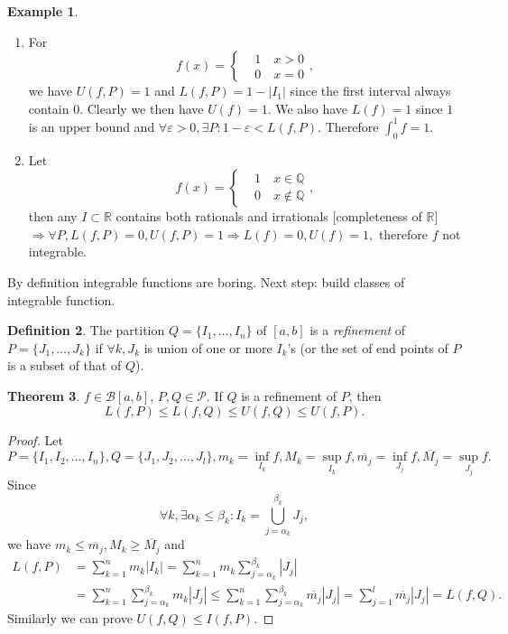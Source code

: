 \documentclass[a4paper]{article}
\theoremstyle{definition}
\newtheorem{defn}{Definition}[subsection]
\newtheorem{thm}[defn]{Theorem}
\newtheorem{example}[defn]{Example}
\begin{document}
\begin{example}
\begin{enumerate}
	\item For
\[
f(x)=\left\{\begin{aligned}
		&1 \quad x>0 \\ &0 \quad x=0
	\end{aligned} \right. ,
\]
 we have $U(f,P)=1$ and $L(f,P)=1-|I_1|$ since the first interval always contain 0. Clearly we then have $U(f)=1$. We also have $L(f)=1$ since $1$ is an upper bound and $\forall \varepsilon >0, \exists P : 1-\varepsilon <L(f,P) .$ Therefore $\int_0^1 f = 1$.
\item Let
\[
f(x)=\left\{\begin{aligned}
	&1 \quad x\in \mathbb Q \\ &0 \quad x\not\in \mathbb Q
\end{aligned} \right. ,
\]
then any $I \subset \mathbb R$ contains both rationals and irrationals [completeness of $\mathbb R$] $\Rightarrow \forall P, L(f,P)=0, U(f,P)=1 \Rightarrow L(f)=0, U(f)=1, $ therefore $f$ not integrable.
\end{enumerate} 
\end{example}

By definition integrable functions are boring. Next step: build classes of integrable function.

\begin{defn}
	The partition $Q=\{I_1,\ldots,I_n\}$ of $[a,b]$ is a \textit{refinement} of $P=\{J_1,\ldots,J_k\}$ if $\forall k, J_k$ is union of one or more $I_k$'s (or the set of end points of $P$ is a subset of that of $Q$).
\end{defn}

\begin{thm}
\label{thm:refineineq}
	$f\in \mathcal B [a,b]$, $P,Q\in \mathcal P$. If $Q$ is a refinement of $P$, then
\[
L(f,P)\leq L(f,Q) \leq U(f,Q)\leq U(f,P) .
\]
\end{thm}

\begin{proof}
	Let $P=\{I_1,I_2,\ldots,I_n\}, Q=\{J_1,J_2,\ldots,J_l\}, m_k=\underset{I_k}{\inf} f, M_k=\underset{I_k}{\sup} f, \overline{m_j}=\underset{J_j}{\inf} f, \overline{M_j}=\underset{J_j}{\sup} f .$ Since
\[
\forall k, \exists \alpha_k \leq \beta_k : I_k = \bigcup_{j=\alpha_k}^{\beta_k} J_j ,
\]
we have $m_k \leq \overline{m_j}, M_k \geq \overline{M_j}$ and
\[
\begin{aligned}
		L(f,P) &=\sum_{k=1}^n m_k |I_k|=\sum_{k=1}^n m_k \sum_{j=\alpha_k}^{\beta_k} |J_j| \\ &=\sum_{k=1}^n \sum_{j=\alpha_k}^{\beta_k} m_k |J_j| \leq \sum_{k=1}^n \sum_{j=\alpha_k}^{\beta_k} \overline{m_j} |J_j| =\sum_{j=1}^l \overline{m_j} |J_j| = L(f,Q) .
	\end{aligned}
\]
Similarly we can prove $U(f,Q)\leq I(f,P) .$
\end{proof}
\end{document}
